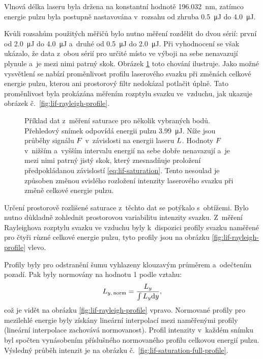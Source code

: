 Vlnová délka laseru byla držena na konstantní
hodnotě \SI{196.032}{\nano\metre},
zatímco energie pulzu byla postupně nastavována v~rozsahu
od zhruba \SI{0.5}{\micro\joule} do \SI{4.0}{\micro\joule}.

Kvůli rozsahům použitých měřičů bylo nutno měření rozdělit do dvou sérií:
první od \SI{2.0}{\micro\joule} do \SI{4.0}{\micro\joule}
a~druhé od \SI{0.5}{\micro\joule} do \SI{2.0}{\micro\joule}.
Při vyhodnocení se však ukázalo, že data z~obou sérií pro určité místo
ve výboji na sebe nenavazují plynule a~je mezi nimi patrný skok.
Obrázek \ref{fig:lif-saturation-full-example} toto chování ilustruje.
Jako možné vysvětlení se nabízí proměnlivost profilu laserového svazku
při změnách celkové energie pulzu, kterou ani prostorový filtr
nedokázal potlačit úplně.
Tato proměnlivost byla prokázána měřením rozptylu svazku ve~vzduchu,
jak ukazuje obrázek č.~\ref{fig:lif-rayleigh-profile}.

\begin{figure}
	\centering
	
	
	
	\caption{Příklad dat z~měření saturace pro několik vybraných bodů.
		Přehledový snímek odpovídá energii pulzu \SI{3.99}{\micro\joule}.
		Níže jsou průběhy signálu $F$ v~závislosti na energii
		laseru $L$.
		Hodnoty $F$ v~nižším a~vyšším intervalu energií na sebe
		dobře nenavazují a~je mezi nimi patrný jistý skok,
		který znesnadňuje proložení předpokládanou
		závislostí \eqref{eq:lif-saturation}.
		Tento nesoulad je způsoben změnou svislého rozložení intenzity
		laserového svazku při změně celkové energie pulzu.}
	\label{fig:lif-saturation-full-example}
\end{figure}

Určení prostorově rozlišené saturace z~těchto dat se potýkalo s~obtížemi.
Bylo nutno důkladně zohlednit prostorovou variabilitu intenzity svazku.
Z~měření Rayleighova rozptylu svazku ve vzduchu byly k~dispozici
profily svazku naměřené pro čtyři různé celkové energie pulzu,
tyto profily jsou na obrázku \ref{fig:lif-rayleigh-profile} vlevo.

Profily byly pro odstranění šumu vyhlazeny klouzavým průměrem
a~odečtením pozadí.
Pak byly normovány na hodnotu 1 podle vztahu:
\begin{equation}
	L_{y,\,\text{norm}} = \frac{L_y}{\int L_y \mathrm{d}y},
\end{equation}
což je vidět na obrázku \ref{fig:lif-rayleigh-profile} vpravo.
Normované profily pro mezilehlé energie byly získány lineární interpolací
mezi naměřenými profily (lineární interpolace zachovává normovanost).
Profil intenzity v~každém snímku byl spočten vynásobením příslušného
normovaného profilu celkovou energií pulzu.
Výsledný průběh intenzit je na obrázku
č.~\ref{fig:lif-saturation-full-profile}.

